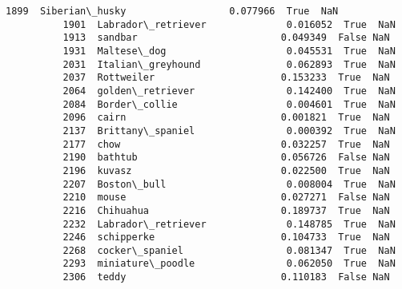 \documentclass[11pt]{article}
\begin{document}
\begin{Verbatim}[commandchars=\\\{\}]
          1899  Siberian\_husky                  0.077966  True  NaN              
          1901  Labrador\_retriever              0.016052  True  NaN              
          1913  sandbar                         0.049349  False NaN              
          1931  Maltese\_dog                     0.045531  True  NaN              
          2031  Italian\_greyhound               0.062893  True  NaN              
          2037  Rottweiler                      0.153233  True  NaN              
          2064  golden\_retriever                0.142400  True  NaN              
          2084  Border\_collie                   0.004601  True  NaN              
          2096  cairn                           0.001821  True  NaN              
          2137  Brittany\_spaniel                0.000392  True  NaN              
          2177  chow                            0.032257  True  NaN              
          2190  bathtub                         0.056726  False NaN              
          2196  kuvasz                          0.022500  True  NaN              
          2207  Boston\_bull                     0.008004  True  NaN              
          2210  mouse                           0.027271  False NaN              
          2216  Chihuahua                       0.189737  True  NaN              
          2232  Labrador\_retriever              0.148785  True  NaN              
          2246  schipperke                      0.104733  True  NaN              
          2268  cocker\_spaniel                  0.081347  True  NaN              
          2293  miniature\_poodle                0.062050  True  NaN              
          2306  teddy                           0.110183  False NaN              
          

\end{Verbatim}
\end{document}
